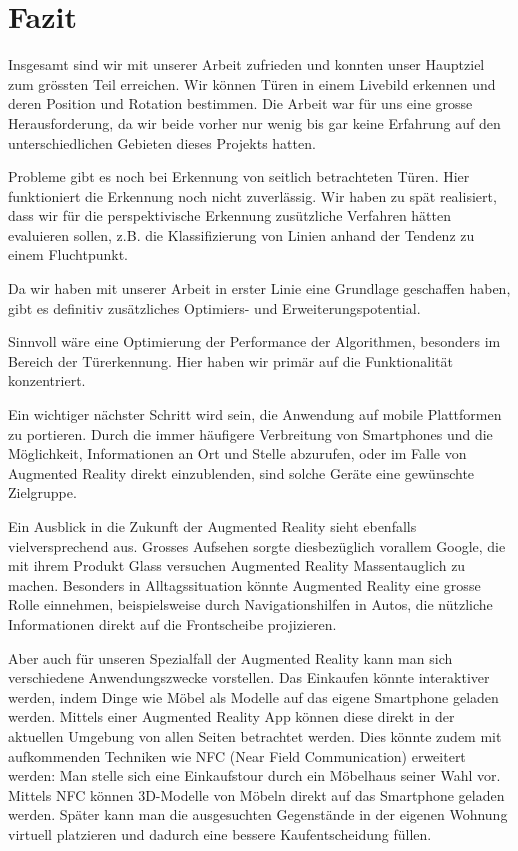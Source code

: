 ﻿\chapter{Fazit}

Insgesamt sind wir mit unserer Arbeit zufrieden und konnten unser Hauptziel zum grössten Teil erreichen. Wir können Türen in einem Livebild erkennen und deren Position und Rotation bestimmen. Die Arbeit war für uns eine grosse Herausforderung, da wir beide vorher nur wenig bis gar keine Erfahrung auf den unterschiedlichen Gebieten dieses Projekts hatten.

Probleme gibt es noch bei Erkennung von seitlich betrachteten Türen. Hier funktioniert die Erkennung noch nicht zuverlässig. Wir haben zu spät realisiert, dass wir für die perspektivische Erkennung zusützliche Verfahren hätten evaluieren sollen, z.B. die Klassifizierung von Linien anhand der Tendenz zu einem Fluchtpunkt.



Da wir haben mit unserer Arbeit in erster Linie eine Grundlage geschaffen haben, gibt es definitiv zusätzliches Optimiers- und Erweiterungspotential.

Sinnvoll wäre eine Optimierung der Performance der Algorithmen, besonders im Bereich der Türerkennung. Hier haben wir primär auf die Funktionalität konzentriert. 

Ein wichtiger nächster Schritt wird sein, die Anwendung auf mobile Plattformen zu portieren. Durch die immer häufigere Verbreitung von Smartphones und die Möglichkeit, Informationen an Ort und Stelle abzurufen, oder im Falle von Augmented Reality direkt einzublenden, sind solche Geräte eine gewünschte Zielgruppe. 

Ein Ausblick in die Zukunft der Augmented Reality sieht ebenfalls vielversprechend aus. Grosses Aufsehen sorgte diesbezüglich vorallem Google, die mit ihrem Produkt Glass versuchen Augmented Reality Massentauglich zu machen. Besonders in Alltagssituation könnte Augmented Reality eine grosse Rolle einnehmen, beispielsweise durch Navigationshilfen in Autos, die nützliche Informationen direkt auf die Frontscheibe projizieren.

Aber auch für unseren Spezialfall der Augmented Reality kann man sich verschiedene Anwendungszwecke vorstellen. Das Einkaufen könnte interaktiver werden, indem Dinge wie Möbel als Modelle auf das eigene Smartphone geladen werden. Mittels einer Augmented Reality App können diese direkt in der aktuellen Umgebung von allen Seiten betrachtet werden. Dies könnte zudem mit aufkommenden Techniken wie NFC (Near Field Communication) erweitert werden: Man stelle sich eine Einkaufstour durch ein Möbelhaus seiner Wahl vor. Mittels NFC können 3D-Modelle von Möbeln direkt auf das Smartphone geladen werden. Später kann man die ausgesuchten Gegenstände in der eigenen Wohnung virtuell platzieren und dadurch eine bessere Kaufentscheidung füllen.

